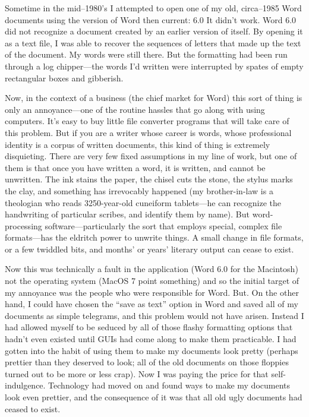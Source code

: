 \documentclass[
  fontsize=11pt,
  paper=landscape,
  twocolumn=true,
  pagesize=pdftex,
  headings=small,
  DIV=15,
  ]{scrartcl}
\begin{document}
Sometime in the mid--1980's I attempted to open one of my old,
circa--1985 Word documents using the version of Word then current: 6.0
It didn't work. Word 6.0 did not recognize a document created by an
earlier version of itself. By opening it as a text file, I was able to
recover the sequences of letters that made up the text of the document.
My words were still there. But the formatting had been run through a log
chipper---the words I'd written were interrupted by spates of empty
rectangular boxes and gibberish.

Now, in the context of a business (the chief market for Word) this sort
of thing is only an annoyance---one of the routine hassles that go along
with using computers. It's easy to buy little file converter programs
that will take care of this problem. But if you are a writer whose
career is words, whose professional identity is a corpus of written
documents, this kind of thing is extremely disquieting. There are very
few fixed assumptions in my line of work, but one of them is that once
you have written a word, it is written, and cannot be unwritten. The ink
stains the paper, the chisel cuts the stone, the stylus marks the clay,
and something has irrevocably happened (my brother-in-law is a
theologian who reads 3250-year-old cuneiform tablets---he can recognize
the handwriting of particular scribes, and identify them by name). But
word-processing software---particularly the sort that employs special,
complex file formats---has the eldritch power to unwrite things. A small
change in file formats, or a few twiddled bits, and months' or years'
literary output can cease to exist.

Now this was technically a fault in the application (Word 6.0 for the
Macintosh) not the operating system (MacOS 7 point something) and so the
initial target of my annoyance was the people who were responsible for
Word. But. On the other hand, I could have chosen the ``save as text''
option in Word and saved all of my documents as simple telegrams, and
this problem would not have arisen. Instead I had allowed myself to be
seduced by all of those flashy formatting options that hadn't even
existed until GUIs had come along to make them practicable. I had gotten
into the habit of using them to make my documents look pretty (perhaps
prettier than they deserved to look; all of the old documents on those
floppies turned out to be more or less crap). Now I was paying the price
for that self-indulgence. Technology had moved on and found ways to make
my documents look even prettier, and the consequence of it was that all
old ugly documents had ceased to exist.
\end{document}
